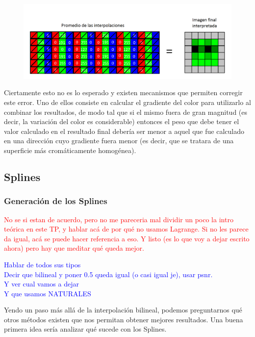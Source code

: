 \documentclass[a4paper]{article}
\begin{document}
\begin{figure}[h!]
	\caption{}
	\begin{center}
	\includegraphics[scale=0.36]{imagenes/apxl3}
	\label{apxl3}
  \end{center}
\end{figure}

\newpage
Ciertamente esto no es lo esperado y existen mecanismos que permiten corregir este error. Uno de ellos consiste en calcular el gradiente del color para utilizarlo al combinar los resultados, de modo tal que si el mismo fuera de gran magnitud (es decir, la variación del color es considerable) entonces el peso que debe tener el valor calculado en el resultado final debería ser menor a aquel que fue calculado en una dirección cuyo gradiente fuera menor (es decir, que se tratara de una superficie más cromáticamente homogénea).



\pagebreak

\newpage
\subsection{Splines}
\subsubsection*{Generación de los Splines}
\textcolor{red}{No se si estan de acuerdo, pero no me pareceria mal dividir un poco la intro teórica en este TP, y hablar acá de por qué no usamos Lagrange. Si no les parece da igual, acá se puede hacer referencia a eso. Y listo (es lo que voy a dejar escrito ahora) pero hay que meditar qué queda mejor.}

\textcolor{blue}{Hablar de todos sus tipos\\
Decir que bilineal y poner 0.5 queda igual (o casi igual je), usar psnr.\\
Y ver cual vamos a dejar\\
Y que usamos NATURALES}

Yendo un paso más allá de la interpolación bilineal, podemos preguntarnos qué otros métodos existen que nos permitan obtener mejores resultados. Una buena primera idea sería analizar qué sucede con los Splines. \\
\end{document}
